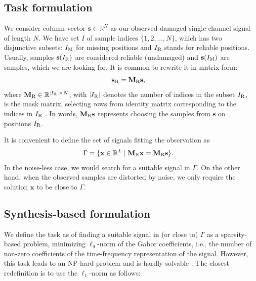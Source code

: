 \documentclass[conference]{IEEEtran}
\newcommand{\todo}[1]{\textcolor{red}{#1}}
\begin{document}
\subsection{Task formulation}

We consider column vector $ \mathbf{s} \in \mathbb{R}^{N} $ as our observed damaged single-channel signal of length $ N $.
We have set $ I $ of sample indices $ \{1,2,\dots,N\} $, which has two disjunctive subsets: $I_\textup{M} $ for missing positions and $ I_\textup{R} $ stands for reliable positions.
Usually, samples $ \mathbf{s}(I_\textup{R}) $ are considered reliable (undamaged) and $ \mathbf{s}(I_\textup{M}) $ are samples, which we are looking for.
It is common to rewrite it in matrix form:
\begin{equation*}
	\mathbf{s}_{\textup{R}} = \mathbf{M}_{\textup{R}}\mathbf{s},
\end{equation*}
where $\mathbf{M}_\textup{R} \in \mathbb{R} ^ { |I_\textup{R}| \times N}$, with $ |I_\textup{R}|$ denotes the number of indices in the subset $I_\textup{R}$, is the mask matrix, selecting rows from identity matrix corresponding to the indices in $I_\textup{R}$ \cite{Adler2012}.
In words, $\mathbf{M}_{\textup{R}}\mathbf{s}$ represents choosing the samples from $\mathbf{s}$ on positions $I_\textup{R}$.

It is convenient to define the set of signals fitting the observation as
\begin{equation}
	\label{eq:Gamma}
	\Gamma = \lbrace \mathbf{x}\in \mathbb {R}^L\mid \mathbf{M}_{\textup{R}}\mathbf{x}=\mathbf{M}_{\textup{R}}\mathbf {s}\rbrace.
\end{equation}
In the noise-less case, we would search for a suitable signal in $\Gamma$.
On the other hand, when the observed samples are distorted by noise, we only require the solution $\mathbf{x}$ to be close to $\Gamma$.

\subsection{Synthesis-based formulation}\label{subsec:freqcoef}

We define the task as of finding a suitable signal in (or close to) $\Gamma$ as a sparsity-based problem, minimizing $ \ell_0 $-norm of the Gabor coefficients, i.e., the number of non-zero coefficients of the time-frequency representation of the signal.
However, this task leads to an NP-hard problem and is hardly solvable \cite{Mokry2020}.
The closest redefinition is to use the $ \ell_1 $-norm as follows:
\end{document}
